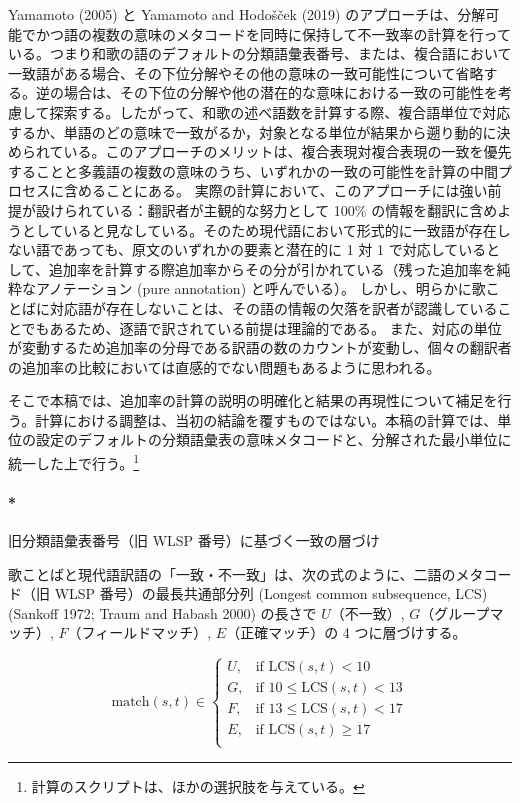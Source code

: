 \documentclass[
  letterpaper,
  DIV=11,
  numbers=noendperiod]{scrartcl}
\let\oldparagraph\paragraph
\renewcommand{\paragraph}[1]{\oldparagraph{#1}\mbox{}}
\begin{document}
Yamamoto (2005) と Yamamoto and Hodošček (2019)
のアプローチは、分解可能でかつ語の複数の意味のメタコードを同時に保持して不一致率の計算を行っている。つまり和歌の語のデフォルトの分類語彙表番号、または、複合語において一致語がある場合、その下位分解やその他の意味の一致可能性について省略する。逆の場合は、その下位の分解や他の潜在的な意味における一致の可能性を考慮して探索する。したがって、和歌の述べ語数を計算する際、複合語単位で対応するか、単語のどの意味で一致がるか，対象となる単位が結果から遡り動的に決められている。このアプローチのメリットは、複合表現対複合表現の一致を優先することと多義語の複数の意味のうち、いずれかの一致の可能性を計算の中間プロセスに含めることにある。
実際の計算において、このアプローチには強い前提が設けられている：翻訳者が主観的な努力として
100\%
の情報を翻訳に含めようとしていると見なしている。そのため現代語において形式的に一致語が存在しない語であっても、原文のいずれかの要素と潜在的に
1 対 1
で対応しているとして、追加率を計算する際追加率からその分が引かれている（残った追加率を純粋なアノテーション
(pure annotation) と呼んでいる）。
しかし、明らかに歌ことばに対応語が存在しないことは、その語の情報の欠落を訳者が認識していることでもあるため、逐語で訳されている前提は理論的である。
また、対応の単位が変動するため追加率の分母である訳語の数のカウントが変動し、個々の翻訳者の追加率の比較においては直感的でない問題もあるように思われる。

そこで本稿では、追加率の計算の説明の明確化と結果の再現性について補足を行う。計算における調整は、当初の結論を覆すものではない。本稿の計算では、単位の設定のデフォルトの分類語彙表の意味メタコードと、分解された最小単位に統一した上で行う。\footnote{計算のスクリプトは、ほかの選択肢を与えている。}

\paragraph*{旧分類語彙表番号（旧 WLSP
番号）に基づく一致の層づけ}\label{ux65e7ux5206ux985eux8a9eux5f59ux8868ux756aux53f7ux65e7-wlsp-ux756aux53f7ux306bux57faux3065ux304fux4e00ux81f4ux306eux5c64ux3065ux3051}

歌ことばと現代語訳語の「一致・不一致」は、次の式のように、二語のメタコード（旧
WLSP 番号）の最長共通部分列 (Longest common subsequence, LCS) (Sankoff
1972; Traum and Habash 2000) の長さで \(U\)（不一致）,
\(G\)（グループマッチ）, \(F\)（フィールドマッチ）,
\(E\)（正確マッチ）の 4 つに層づけする。

\[
\text{match}(s,t) \in
\begin{cases}
U, & \text{if } \text{LCS}(s,t) < 10 \\
G, & \text{if } 10 \leq \text{LCS}(s,t) < 13 \\
F, & \text{if } 13 \leq \text{LCS}(s,t) < 17 \\
E, & \text{if } \text{LCS}(s,t) \geq 17 \\
\end{cases}
\]
\end{document}
